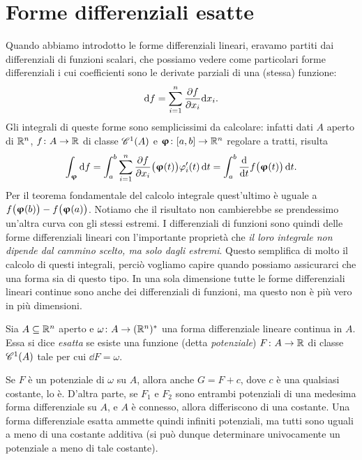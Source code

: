 \section{Forme differenziali esatte}
Quando abbiamo introdotto le forme differenziali lineari, eravamo partiti dai differenziali di funzioni scalari, che possiamo vedere come particolari forme differenziali i cui coefficienti sono le derivate parziali di una (stessa) funzione:
\begin{equation}
	\dd f=\sum_{i=1}^n\drp{f}{x_i}\dd x_i.
\end{equation}
Gli integrali di queste forme sono semplicissimi da calcolare: infatti dati $A$ aperto di $\R^n$, $f\colon A\to\R$ di classe $\cont[1]{A}$ e $\vphi\colon[a,b]\to\R^n$ regolare a tratti, risulta
\begin{equation}
	\int_{\vphi}\dd f=\int_a^b\sum_{i=1}^n\drp{f}{x_i}\big(\vphi(t)\big)\phi_i'(t)\,\dd t=\int_a^b\drv{}{t}f\big(\vphi(t)\big)\,\dd t.
\end{equation}
Per il teorema fondamentale del calcolo integrale quest'ultimo è uguale a $f\big(\vphi(b)\big)-f\big(\vphi(a)\big)$.
Notiamo che il risultato non cambierebbe se prendessimo un'altra curva con gli stessi estremi.
I differenziali di funzioni sono quindi delle forme differenziali lineari con l'importante proprietà che \emph{il loro integrale non dipende dal cammino scelto, ma solo dagli estremi}.
Questo semplifica di molto il calcolo di questi integrali, perciò vogliamo capire quando possiamo assicurarci che una forma sia di questo tipo.
In una sola dimensione tutte le forme differenziali lineari continue sono anche dei differenziali di funzioni, ma questo non è più vero in più dimensioni.
\begin{definizione} \label{d:forma-differenziale-esatta}
	Sia $A\subseteq\R^n$ aperto e $\omega\colon A\to(\R^n)^*$ una forma differenziale lineare continua in $A$.
	Essa si dice \emph{esatta} se esiste una funzione (detta \emph{potenziale}) $F\colon A\to\R$ di classe $\cont[1]{A}$ tale per cui $\dd F=\omega$.
\end{definizione}
\begin{osservazione}
	Se $F$ è un potenziale di $\omega$ su $A$, allora anche $G=F+c$, dove $c$ è una qualsiasi costante, lo è.
	D'altra parte, se $F_1$ e $F_2$ sono entrambi potenziali di una medesima forma differenziale su $A$, e $A$ è connesso, allora differiscono di una costante. %
	Una forma differenziale esatta ammette quindi infiniti potenziali, ma tutti sono uguali a meno di una costante additiva (si può dunque determinare univocamente un potenziale a meno di tale costante).
\end{osservazione}
